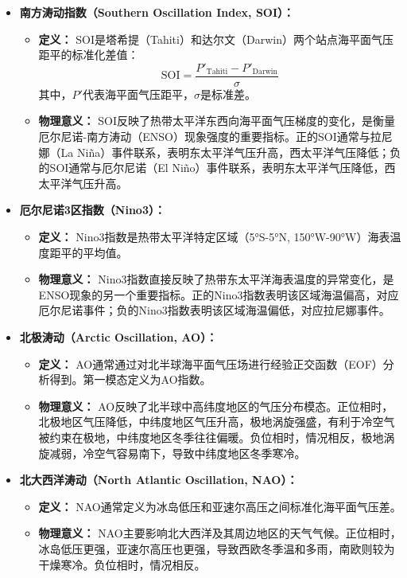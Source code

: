 \documentclass[10pt,hyperref,a4paper,UTF8]{ctexart}
\begin{document}
\begin{itemize}
    \item \textbf{南方涛动指数（Southern Oscillation Index, SOI）：}
    \begin{itemize}
        \item \textbf{定义：} SOI是塔希提（Tahiti）和达尔文（Darwin）两个站点海平面气压距平的标准化差值：
        \begin{equation}
        \text{SOI} = \frac{P'_{\text{Tahiti}} - P'_{\text{Darwin}}}{\sigma}
        \end{equation}
        其中，$P'$代表海平面气压距平，$\sigma$是标准差。
        \item \textbf{物理意义：} SOI反映了热带太平洋东西向海平面气压梯度的变化，是衡量厄尔尼诺-南方涛动（ENSO）现象强度的重要指标。正的SOI通常与拉尼娜（La Niña）事件联系，表明东太平洋气压升高，西太平洋气压降低；负的SOI通常与厄尔尼诺（El Niño）事件联系，表明东太平洋气压降低，西太平洋气压升高。
    \end{itemize}

    \item \textbf{厄尔尼诺3区指数（Nino3）：}
    \begin{itemize}
        \item \textbf{定义：} Nino3指数是热带太平洋特定区域（5°S-5°N, 150°W-90°W）海表温度距平的平均值。
        \item \textbf{物理意义：} Nino3指数直接反映了热带东太平洋海表温度的异常变化，是ENSO现象的另一个重要指标。正的Nino3指数表明该区域海温偏高，对应厄尔尼诺事件；负的Nino3指数表明该区域海温偏低，对应拉尼娜事件。
    \end{itemize}

    \item \textbf{北极涛动（Arctic Oscillation, AO）：}
    \begin{itemize}
        \item \textbf{定义：} AO通常通过对北半球海平面气压场进行经验正交函数（EOF）分析得到。第一模态定义为AO指数。
        \item \textbf{物理意义：} AO反映了北半球中高纬度地区的气压分布模态。正位相时，北极地区气压降低，中纬度地区气压升高，极地涡旋强盛，有利于冷空气被约束在极地，中纬度地区冬季往往偏暖。负位相时，情况相反，极地涡旋减弱，冷空气容易南下，导致中纬度地区冬季寒冷。
    \end{itemize}

    \item \textbf{北大西洋涛动（North Atlantic Oscillation, NAO）：}
    \begin{itemize}
        \item \textbf{定义：} NAO通常定义为冰岛低压和亚速尔高压之间标准化海平面气压差。
        \item \textbf{物理意义：} NAO主要影响北大西洋及其周边地区的天气气候。正位相时，冰岛低压更强，亚速尔高压也更强，导致西欧冬季温和多雨，南欧则较为干燥寒冷。负位相时，情况相反。
    \end{itemize}
\end{itemize}
\end{document}
